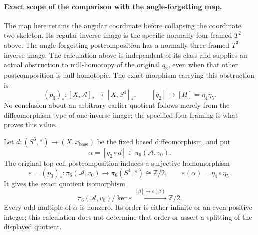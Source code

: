 \paragraph{Exact scope of the comparison with the angle-forgetting map.}
The map here retains the angular coordinate before collapsing the
coordinate two-skeleton.  Its regular inverse image is the specific
normally four-framed \(T^2\) above.  The angle-forgetting
postcomposition has a normally three-framed \(T^3\) inverse image.
The calculation above is independent of its class and supplies an
actual obstruction to null-homotopy of the original \(q_2\), even
when that other postcomposition is null-homotopic.  The exact
morphism carrying this obstruction is
\[
 (p_3)_*:[X,\mathcal A]_*\longrightarrow[X,S^4]_*,\qquad
 [q_2]\longmapsto[H]=\eta_4\eta_5.
\]
No conclusion about an arbitrary earlier quotient follows merely
from the diffeomorphism type of one inverse image; the specified
four-framing is what proves this value.

\begin{corollary}
\label{wb:h24:ret:q2-detected-quotient}

Let \(d:(S^6,*)\to(X,x_{\mathrm{base}})\) be the fixed based
diffeomorphism, and put
\[
\alpha=[q_2\circ d]\in\pi_6(\mathcal A,v_0).
\]
The original top-cell postcomposition induces a surjective homomorphism
\[
\varepsilon=(p_3)_*:\pi_6(\mathcal A,v_0)
  \longrightarrow\pi_6(S^4,*)\cong\mathbb Z/2,
\qquad \varepsilon(\alpha)=\eta_4\circ\eta_5.
\]
It gives the exact quotient isomorphism
\[
\pi_6(\mathcal A,v_0)/\ker\varepsilon
 \xrightarrow{\ [\beta]\mapsto\varepsilon(\beta)\ }
\mathbb Z/2.
\]
Every odd multiple of \(\alpha\) is nonzero. Its order is either
infinite or an even positive integer; this calculation does not determine
that order or assert a splitting of the displayed quotient.
\end{corollary}


